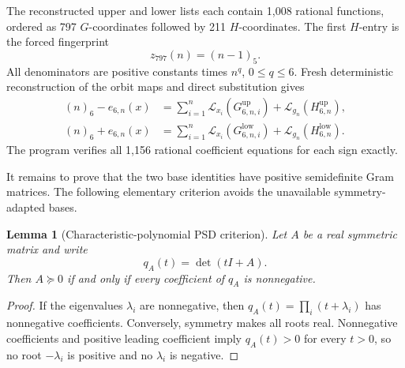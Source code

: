 \documentclass[11pt]{article}
\newtheorem{lemma}[theorem]{Lemma}
\newcommand{\Lcal}{\mathcal L}
\newcommand{\fall}[2]{(#1)_{#2}}
\newcommand{\up}{\mathrm{up}}
\newcommand{\low}{\mathrm{low}}
\begin{document}
The reconstructed upper and lower lists each contain 1,008 rational
functions, ordered as 797 \(G\)-coordinates followed by 211
\(H\)-coordinates.  The first \(H\)-entry is the forced fingerprint
\[
 z_{797}(n)=\fall{n-1}{5}.
\]
All denominators are positive constants times \(n^q\), \(0\le q\le6\).
Fresh deterministic reconstruction of the orbit maps and direct substitution gives
\begin{align}
 \fall n6-e_{6,n}(x)
 &=\sum_{i=1}^n\Lcal_{x_i}(G_{6,n,i}^{\up})
   +\Lcal_{g_n}(H_{6,n}^{\up}),\label{eq:m6-upper-identity}\\
 \fall n6+e_{6,n}(x)
 &=\sum_{i=1}^n\Lcal_{x_i}(G_{6,n,i}^{\low})
   +\Lcal_{g_n}(H_{6,n}^{\low}).\label{eq:m6-lower-identity}
\end{align}
The program
verifies all 1,156 rational coefficient equations for each sign exactly.

It remains to prove that the two base identities have positive semidefinite
Gram matrices.  The following elementary criterion avoids the unavailable
symmetry-adapted bases.

\begin{lemma}[Characteristic-polynomial PSD criterion]
\label{lem:charpoly-psd}
Let \(A\) be a real symmetric matrix and write
\[
 q_A(t)=\det(tI+A).
\]
Then \(A\succeq0\) if and only if every coefficient of \(q_A\) is
nonnegative.
\end{lemma}

\begin{proof}
If the eigenvalues \(\lambda_i\) are nonnegative, then
\(q_A(t)=\prod_i(t+\lambda_i)\) has nonnegative coefficients.  Conversely,
symmetry makes all roots real.  Nonnegative coefficients and positive leading
coefficient imply \(q_A(t)>0\) for every \(t>0\), so no root
\(-\lambda_i\) is positive and no \(\lambda_i\) is negative.
\end{proof}
\end{document}
